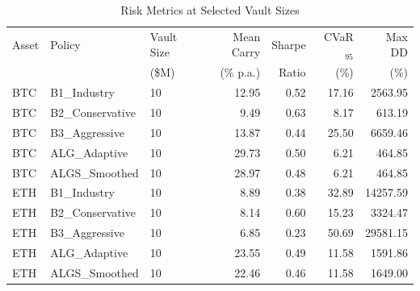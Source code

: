 \begin{table}[h]
\centering
\caption{Risk Metrics at Selected Vault Sizes}
\label{tab:risk_metrics}
\begin{tabular}{lllrrrr}
\toprule
Asset & Policy & Vault Size & Mean Carry & Sharpe & CVaR$_{95}$ & Max DD \\
 & & (\$M) & (\% p.a.) & Ratio & (\%) & (\%) \\
\midrule
BTC & B1_Industry & 10 & 12.95 & 0.52 & 17.16 & 2563.95 \\
BTC & B2_Conservative & 10 & 9.49 & 0.63 & 8.17 & 613.19 \\
BTC & B3_Aggressive & 10 & 13.87 & 0.44 & 25.50 & 6659.46 \\
BTC & ALG_Adaptive & 10 & 29.73 & 0.50 & 6.21 & 464.85 \\
BTC & ALGS_Smoothed & 10 & 28.97 & 0.48 & 6.21 & 464.85 \\
ETH & B1_Industry & 10 & 8.89 & 0.38 & 32.89 & 14257.59 \\
ETH & B2_Conservative & 10 & 8.14 & 0.60 & 15.23 & 3324.47 \\
ETH & B3_Aggressive & 10 & 6.85 & 0.23 & 50.69 & 29581.15 \\
ETH & ALG_Adaptive & 10 & 23.55 & 0.49 & 11.58 & 1591.86 \\
ETH & ALGS_Smoothed & 10 & 22.46 & 0.46 & 11.58 & 1649.00 \\
\bottomrule
\end{tabular}
\end{table}